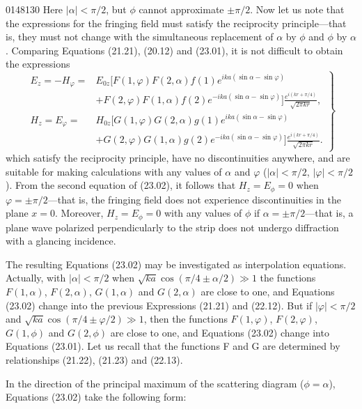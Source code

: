 \begin{scanpage}{0148}{130}
Here $|\alpha|<\pi/2$, but $\phi$ cannot approximate $\pm\pi/2$. Now let us note that the expressions for the fringing field must satisfy the reciprocity principle---that is, they must not change with the simultaneous replacement of $\alpha$ by $\phi$ and $\phi$ by $\alpha$. Comparing Equations (21.21), (20.12) and (23.01), it is not difficult to obtain the expressions
\[
\left.\begin{aligned}E_z=-H_\varphi={}&E_{0z}[F(1,\varphi)F(2,\alpha)f(1)e^{ika(\sin\alpha-\sin\varphi)}\\&+F(2,\varphi)F(1,\alpha)f(2)e^{-ika(\sin\alpha-\sin\varphi)}]\frac{e^{i(kr+\pi/4)}}{\sqrt{2\pi kr}},\\
H_z=E_\varphi={}&H_{0z}[G(1,\varphi)G(2,\alpha)g(1)e^{ika(\sin\alpha-\sin\varphi)}\\&+G(2,\varphi)G(1,\alpha)g(2)e^{-ika(\sin\alpha-\sin\varphi)}]\frac{e^{i(kr+\pi/4)}}{\sqrt{2\pi kr}}.
\end{aligned}\right\}\tag{23.02}
\]
which satisfy the reciprocity principle, have no discontinuities anywhere, and are suitable for making calculations with any values of $\alpha$ and $\varphi$ ($|\alpha|<\pi/2$, $|\varphi|<\pi/2$). From the second equation of (23.02), it follows that $H_z=E_\phi=0$ when $\varphi=\pm\pi/2$---that is, the fringing field does not experience discontinuities in the plane $x=0$. Moreover, $H_z=E_\phi=0$ with any values of $\phi$ if $\alpha=\pm\pi/2$---that is, a plane wave polarized perpendicularly to the strip does not undergo diffraction with a glancing incidence.

The resulting Equations (23.02) may be investigated as interpolation equations. Actually, with $|\alpha|<\pi/2$ when $\sqrt{ka}\cos(\pi/4\pm\alpha/2)\gg1$ the functions $F(1,\alpha)$, $F(2,\alpha)$, $G(1,\alpha)$ and $G(2,\alpha)$ are close to one, and Equations (23.02) change into the previous Expressions (21.21) and (22.12). But if $|\varphi|<\pi/2$ and $\sqrt{ka}\cos(\pi/4\pm\varphi/2)\gg1$, then the functions $F(1,\varphi)$, $F(2,\varphi)$, $G(1,\phi)$ and $G(2,\phi)$ are close to one, and Equations (23.02) change into Equations (23.01). Let us recall that the functions F and G are determined by relationships (21.22), (21.23) and (22.13).

In the direction of the principal maximum of the scattering diagram ($\phi=\alpha$), Equations (23.02) take the following form:
\end{scanpage}
